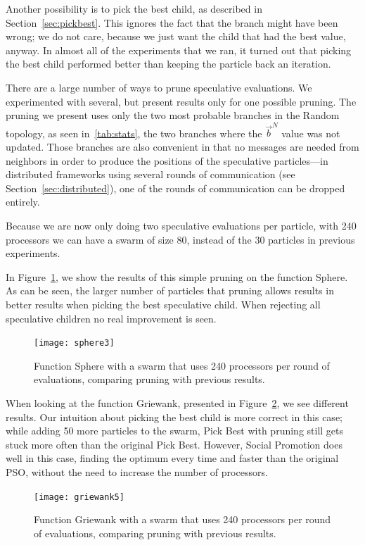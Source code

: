 \documentclass[journal,letterpaper]{IEEEtran}
\renewcommand{\sec}[1]{Section~\ref{sec:#1}}
\newcommand{\fig}[1]{Figure~\ref{fig:#1}}
\providecommand{\neigh}{\ensuremath{N}}
\providecommand{\nbest}{\ensuremath{\Vec{b}^\neigh}}
\begin{document}
Another possibility is to pick the best child, as described in \sec{pickbest}.
This ignores the fact that the branch might have been wrong; we do not care,
because we just want the child that had the best value, anyway.  In almost all
of the experiments that we ran, it turned out that picking the best child
performed better than keeping the particle back an iteration.

There are a large number of ways to prune speculative evaluations.  We
experimented with several, but present results only for one possible pruning.
The pruning we present uses only the two most probable branches in the Random
topology, as seen in~\ref{tab:stats}, the two branches where the $\nbest$ value
was not updated.  Those branches are also convenient in that no messages are
needed from neighbors in order to produce the positions of the speculative
particles---in distributed frameworks using several rounds of communication
(see \sec{distributed}), one of the rounds of communication can be dropped
entirely.

Because we are now only doing two speculative evaluations per particle, with
240 processors we can have a swarm of size 80, instead of the 30 particles in
previous experiments.  

In \fig{sphere-pruned}, we show the results of this simple pruning on the
function Sphere.  As can be seen, the larger number of particles that pruning
allows results in better results when picking the best speculative child.  
When rejecting all speculative children no real improvement is seen.

\begin{figure}
  \centering
  \texttt{[image: sphere3]}
  \caption{Function Sphere with a swarm that uses 240 processors per round of
  evaluations, comparing pruning with previous results.}
  \label{fig:sphere-pruned}
\end{figure}

When looking at the function Griewank, presented in \fig{griewank-pruned}, we
see different results.  Our intuition about picking the best child is more
correct in this case; while adding 50 more particles to the swarm, Pick Best
with pruning still gets stuck more often than the original Pick Best.  However,
Social Promotion does well in this case, finding the optimum every time and
faster than the original PSO, without the need to increase the number of
processors.

\begin{figure}
  \centering
  \texttt{[image: griewank5]}
  \caption{Function Griewank with a swarm that uses 240 processors per round of
  evaluations, comparing pruning with previous results.}
  \label{fig:griewank-pruned}
\end{figure}
\end{document}
